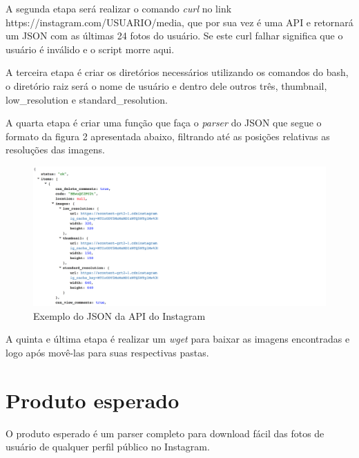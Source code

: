 \documentclass[12pt]{article}
\begin{document}
	A segunda etapa será realizar o comando \textit{curl} no link https://instagram.com/USUARIO/media, que por sua vez é uma API e retornará um JSON com as últimas 24 fotos do usuário. Se este curl falhar significa que o usuário é inválido e o script morre aqui.
	
	A terceira etapa é criar os diretórios necessários utilizando os comandos do bash, o diretório raiz será o nome de usuário e dentro dele outros três, thumbnail, low\_resolution e standard\_resolution.
	
	A quarta etapa é criar uma função que faça o \textit{parser} do JSON que segue o formato da figura 2 apresentada abaixo, filtrando até as posições relativas as resoluções das imagens.
	
\begin{figure}[ht]
\centering
\includegraphics[width=1.5\textwidth]{fig2}
\caption{Exemplo do JSON da API do Instagram}
\end{figure}
	
	A quinta e última etapa é realizar um \textit{wget} para baixar as imagens encontradas e logo após movê-las para suas respectivas pastas.
	
\section{Produto esperado}
	O produto esperado é um parser completo para download fácil das fotos de usuário de qualquer perfil público no Instagram.
\end{document}
